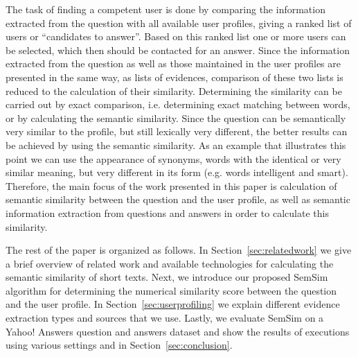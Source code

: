 \documentclass[conference]{IEEEtran}
\newcommand{\secref}[1]{Section~\ref{#1}}
\begin{document}
The task of finding a competent user is done by comparing the information extracted from the question with all available user profiles, giving a ranked list of users or ``candidates to answer''. Based on this ranked list one or more users can be selected, which then should be contacted for an answer. Since the information extracted from the question as well as those maintained in the user profiles are presented in the same way, as lists of evidences, comparison of these two lists is reduced to the calculation of their similarity. Determining the similarity can be carried out by exact comparison, i.e. determining exact matching between words, or by calculating the semantic similarity. Since the question can be semantically very similar to the profile, but still lexically very different, the better results can be achieved by using the semantic similarity. As an example that illustrates this point we can use the appearance of synonyms, words with the identical or very similar meaning, but very different in its form (e.g. words intelligent and smart). Therefore, the main focus of the work presented in this paper is calculation of semantic similarity between the question and the user profile, as well as semantic information extraction from questions and answers in order to calculate this similarity.

The rest of the paper is organized as follows. In \secref{sec:relatedwork} we give a brief overview of related work and available technologies for calculating the semantic similarity of short texts. Next, we introduce our proposed SemSim algorithm for determining the numerical similarity score between the question and the user profile. In \secref{sec:userprofiling} we explain different evidence extraction types and sources that we use. Lastly, we evaluate SemSim on a Yahoo! Answers question and answers dataset and show the results of executions using various settings and in \secref{sec:conclusion}. 




%
%
\end{document}
